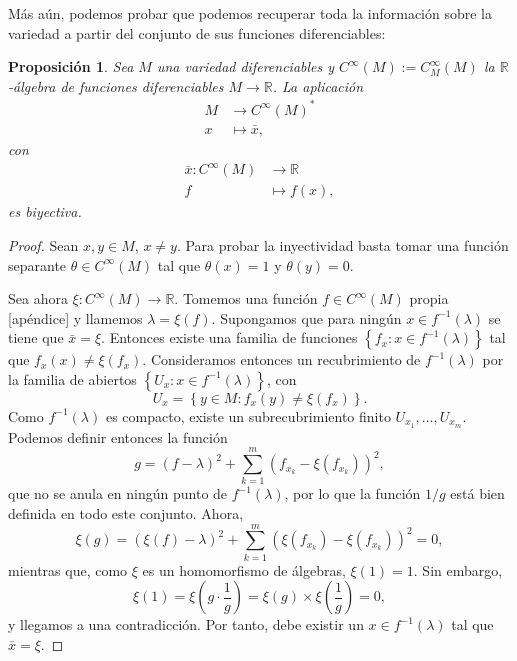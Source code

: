 \documentclass[12pt,a4paper]{book}
\newtheorem{prop}[thm]{Proposición}
\theoremstyle{definition} \newtheorem{defn}[thm]{Definición}
\theoremstyle{definition} \newtheorem{ejemplo}[thm]{Ejemplo}
\theoremstyle{definition} \newtheorem{ejercicio}[thm]{Ejercicio}
\theoremstyle{remark} \newtheorem*{obs}{Observación}
\def\RR{\mathbb{R}}
\begin{document}
	  Más aún, podemos probar que podemos recuperar toda la información sobre la variedad a partir del conjunto de sus funciones diferenciables:
	  \begin{prop}
 Sea $M$ una variedad diferenciables y $C^\infty(M):=C_M^\infty(M)$ la $\RR$-álgebra de funciones diferenciables $M\rightarrow \RR$.  La aplicación
  \begin{align*}
    M&\longrightarrow C^{\infty}(M)^*\\ 
    x &\longmapsto \bar{x}, 
    \end{align*}
    con
    \begin{align*}
      \bar{x} :C^{\infty}(M)&\longrightarrow \RR\\ 
        f &\longmapsto f(x),
      \end{align*}
      es biyectiva.
\end{prop}
\begin{proof}\leavevmode

  Sean $x,y \in M$, $x\neq y$. Para probar la inyectividad basta tomar una función separante $\theta\in C^{\infty}(M)$ tal que $\theta(x)=1$ y $\theta(y)=0$. 

  Sea ahora $\xi: C^{\infty}(M)\rightarrow \RR$. Tomemos una función $f\in C^{\infty}(M)$ propia [apéndice] y llamemos $\lambda=\xi(f)$. Supongamos que para ningún $x\in f^{-1}(\lambda)$ se tiene que $\bar{x}=\xi$. Entonces existe una familia de funciones $\left\{ f_x: x\in f^{-1}(\lambda) \right\}$ tal que $f_x(x)\neq \xi (f_x)$. Consideramos entonces un recubrimiento de $f^{-1}(\lambda)$ por la familia de abiertos $\left\{ U_x : x\in f^{-1}(\lambda) \right\}$, con $$U_x= \left\{ y\in M:f_x(y)\neq \xi(f_x) \right\}.$$
  Como $f^{-1}(\lambda)$ es compacto, existe un subrecubrimiento finito $U_{x_1},\dots,U_{x_m}$. Podemos definir entonces la función
  \begin{equation*}
    g=(f-\lambda)^{2}+\sum_{k=1}^m(f_{x_k}-\xi(f_{x_k}))^2,
  \end{equation*}
  que no se anula en ningún punto de $f^{-1}(\lambda)$, por lo que la función $1/g$ está bien definida en todo este conjunto. Ahora,
  \begin{equation*}
    \xi(g)=(\xi(f)-\lambda)^2+\sum_{k=1}^m(\xi(f_{x_k})-\xi(f_{x_k}))^2=0,
  \end{equation*}
  mientras que, como $\xi$ es un homomorfismo de álgebras, $\xi(1)=1$. Sin embargo,
  \begin{equation*}
    \xi(1)=\xi\left(g\cdot \frac{1}{g}\right)=\xi(g) \times \xi\left(\frac{1}{g}\right)=0,
  \end{equation*}
  y llegamos a una contradicción. Por tanto, debe existir un $x\in f^{-1}(\lambda)$ tal que $\bar{x}=\xi$.
\end{proof}
\end{document}
